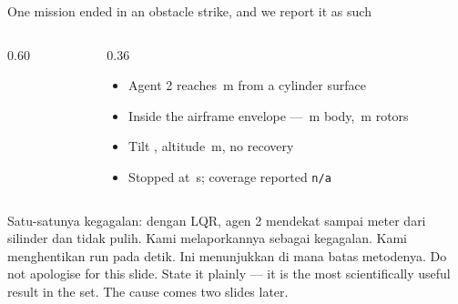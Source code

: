 \documentclass[aspectratio=169,11pt,t]{beamer}
\renewcommand{\sectioncount}{9}
\begin{document}
\begin{frame}{One mission ended in an obstacle strike, and we report it as such}
  \begin{columns}[T,onlytextwidth]
    \begin{column}{0.60\textwidth}
    \end{column}
    \begin{column}{0.36\textwidth}
      \vskip3mm
      \begin{itemize}\bulletgap
        \item Agent 2 reaches \UpRectLqrSurf\,m from a cylinder surface
        \item Inside the airframe envelope --- \BodyHalf\,m body,
              \RotorReach\,m rotors
        \item Tilt \UpRectLqrTilt\textdegree, altitude \UpRectLqrZmin\,m, no recovery
        \item Stopped at \TmisRectLqr\,s; coverage reported \texttt{n/a}
      \end{itemize}
    \end{column}
  \end{columns}
    {Satu-satunya kegagalan: dengan LQR, agen 2 mendekat sampai \UpRectLqrSurf\space meter dari silinder dan tidak pulih. Kami melaporkannya sebagai kegagalan. Kami menghentikan run pada \TmisRectLqr\space detik. Ini menunjukkan di mana batas metodenya.}
    {Do not apologise for this slide. State it plainly --- it is the most
        scientifically useful result in the set. The cause comes two slides later.}
\end{frame}

\kick{Results}{8 / \sectioncount}
\end{document}
